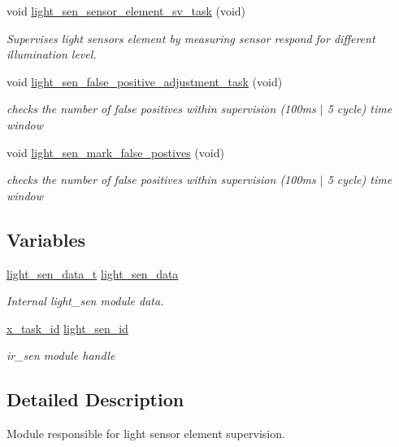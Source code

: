 \begin{DoxyCompactItemize}
void \hyperlink{a00047_ae68a20cad10654012eae75a1941f53db}{light\+\_\+sen\+\_\+sensor\+\_\+element\+\_\+sv\+\_\+task} (void)
\begin{DoxyCompactList}\small\item\em Supervises light sensors element by measuring sensor respond for different illumination level. \end{DoxyCompactList}\item 
void \hyperlink{a00047_a05bd338db50fc948cf13db4f250894da}{light\+\_\+sen\+\_\+false\+\_\+positive\+\_\+adjustment\+\_\+task} (void)
\begin{DoxyCompactList}\small\item\em checks the number of false positives within supervision (100ms $\vert$ 5 cycle) time window \end{DoxyCompactList}\item 
void \hyperlink{a00047_acef1622ec5c40fe90bf6184813716e34}{light\+\_\+sen\+\_\+mark\+\_\+false\+\_\+postives} (void)
\begin{DoxyCompactList}\small\item\em checks the number of false positives within supervision (100ms $\vert$ 5 cycle) time window \end{DoxyCompactList}\end{DoxyCompactItemize}
\subsection*{Variables}
\begin{DoxyCompactItemize}
\item 
\hyperlink{a00024_d8/d2e/a00588}{light\+\_\+sen\+\_\+data\+\_\+t} \hyperlink{a00047_a53c98c9f84d5cecf0747bbe1f6b83696}{light\+\_\+sen\+\_\+data}
\begin{DoxyCompactList}\small\item\em Internal light\+\_\+sen module data. \end{DoxyCompactList}\item 
\hyperlink{a00036_ad5c3c5fbfd3e4aadf22830395484a71d}{x\+\_\+task\+\_\+id} \hyperlink{a00047_a757e7771170ace1d9f8519bd318ec64a}{light\+\_\+sen\+\_\+id}
\begin{DoxyCompactList}\small\item\em ir\+\_\+sen module handle \end{DoxyCompactList}\end{DoxyCompactItemize}


\subsection{Detailed Description}
Module responsible for light sensor element supervision. 



